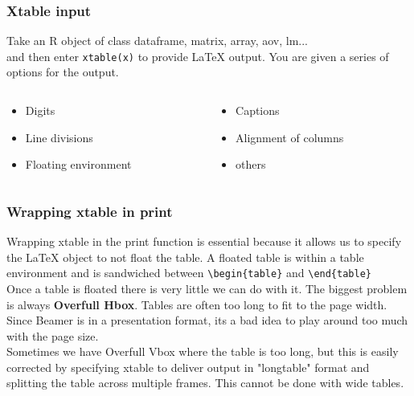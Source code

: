 \documentclass[nogin]{beamer}\usepackage[]{graphicx}\usepackage[]{color}
\begin{document}
\begin{frame}
\frametitle{Xtable input}
\begin{block}{}
Take an R object of class dataframe, matrix, array, aov, lm...\\
and then enter \verb|xtable(x)| to provide LaTeX output. You are given a series of options for the output.
\end{block}
\begin{columns}[T]
\begin{column}{.5\textwidth}
\begin{itemize}
\item Digits
\item Line divisions
\item Floating environment
\end{itemize}
\end{column}
\begin{column}{.5\textwidth}
\begin{itemize}
\item Captions
\item Alignment of columns
\item others
\end{itemize}
\end{column}
\end{columns}
\end{frame}

\begin{frame}
\frametitle{Wrapping xtable in print}
\small
Wrapping xtable in the print function is essential because it allows us to specify the LaTeX object to not float the table. A floated table is within a table environment and is sandwiched between \verb|\begin{table}| and \verb|\end{table}|\\[\baselineskip]
Once a table is floated there is very little we can do with it. The biggest problem is always \textbf{Overfull Hbox}. Tables are often too long to fit to the page width. Since Beamer is in a presentation format, its a bad idea to play around too much with the page size.\\[\baselineskip]

Sometimes we have Overfull Vbox where the table is too long, but this is easily corrected by specifying xtable to deliver output in "longtable" format and splitting the table across multiple frames. This cannot be done with wide tables. 
\end{frame}
\end{document}
